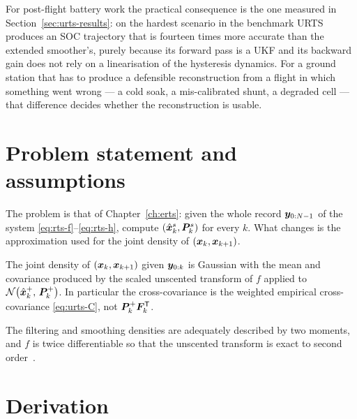 For post-flight battery work the practical consequence is the one measured in
Section~\ref{sec:urts-results}: on the hardest scenario in the benchmark URTS produces an SOC
trajectory that is fourteen times more accurate than the extended smoother's, purely because its
forward pass is a UKF and its backward gain does not rely on a linearisation of the hysteresis
dynamics.  For a ground station that has to produce a defensible reconstruction from a flight in
which something went wrong --- a cold soak, a mis-calibrated shunt, a degraded cell --- that
difference decides whether the reconstruction is usable.

\section{Problem statement and assumptions}
The problem is that of Chapter~\ref{ch:erts}: given the whole record $\bm{y}_{0:N-1}$ of the system
\eqref{eq:rts-f}--\eqref{eq:rts-h}, compute $(\hat{\bm{x}}^s_k,\bm{P}^s_k)$ for every $k$.  What changes is the
approximation used for the joint density of $(\bm{x}_k,\bm{x}_{k+1})$.

\begin{assumption}\label{as:urts-joint}
The joint density of $(\bm{x}_k,\bm{x}_{k+1})$ given $\bm{y}_{0:k}$ is Gaussian with the mean and covariance
produced by the scaled unscented transform of $f$ applied to $\mathcal{N}\!\left(\hat{\bm{x}}^{+}_k,\,\bm{P}^+_k\right)$.  In
particular the cross-covariance is the weighted empirical cross-covariance \eqref{eq:urts-C}, not
$\bm{P}^+_k\bm{F}_k^{\mathsf{T}}$.
\end{assumption}

\begin{assumption}
The filtering and smoothing densities are adequately described by two moments, and $f$ is twice
differentiable so that the unscented transform is exact to second order~\cite{julier2004unscented}.
\end{assumption}

\section{Derivation}

